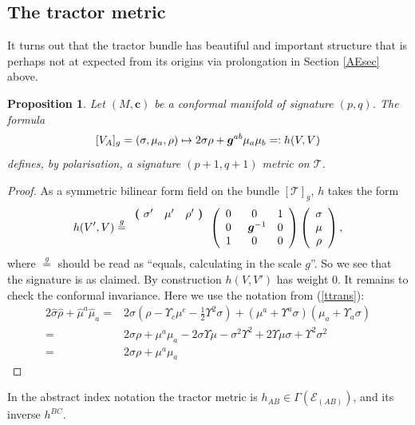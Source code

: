 \documentclass[a4paper,12pt]{amsart}
\def\Cal{\mathcal}
\newcommand{\cc}{\boldsymbol{c}}
\newcommand{\ce}{{\Cal E}}
\newcommand{\cT}{{\mathcal T}}
\def\bg{\mbox{\boldmath $g$}}
\newtheorem{proposition}[theorem]{Proposition}
\theoremstyle{remark}
\newcommand{\nn}[1]{(\ref{#1})}
\begin{document}
\subsection{The tractor metric}\label{msec}
It turns out that the tractor bundle has beautiful and important
structure that is perhaps not at expected from its origins via
prolongation in Section \ref{AEsec} above.
\begin{proposition} \label{metp} Let $(M,\cc)$ be a conformal manifold of signature $(p,q)$. The formula
\begin{equation}\nonumber 
[V_A]_g=(\sigma,\mu_a,\rho)\mapsto 2\sigma\rho+\bg^{ab}\mu_a\mu_b=:h(V,V)
\end{equation}
defines, by polarisation, a signature $(p+1,q+1)$ metric on $\mathcal{T}$.
\end{proposition}
\begin{proof}
As a symmetric bilinear form field on the bundle $[\cT]_g$, $h$ takes the form
\begin{equation}\label{mform}
h(V',V)\stackrel{g}{=}
\begin{array}{c c c} \boldsymbol{(}~\sigma' & \mu' & \rho'~\boldsymbol{)} \\ 
&&\\
&&
\end{array} 
\left(
\begin{array}{c c c}
0 & 0 & 1\\ 
0 & \phantom{1}\bg^{-1} & 0\\
1 & 0 & 0
\end{array}
\right)\left(
\begin{array}{c}
\sigma\\ 
 \mu \\
\rho
\end{array}
\right),
\end{equation}
where $\stackrel{g}{=}$ should be read as ``equals, calculating in the
scale $g$''. So we see that the signature is as claimed. By
construction $h(V,V')$ has weight 0.  It remains to check the
conformal invariance. Here we use the notation from \nn{ttrans}:
\begin{equation}\nonumber
\begin{split}
2\widehat{\sigma}\widehat{\rho}+\widehat{\mu}^a\widehat{\mu}_a=&
2\sigma(\rho-\Upsilon_c\mu^c-\frac{1}{2}\Upsilon^2\sigma)+
(\mu^a+\Upsilon^a\sigma)(\mu_a+\Upsilon_a\sigma)\\
=& 2\sigma\rho+\mu^a\mu_a-2\sigma\Upsilon\mu-\sigma^2\Upsilon^2+
2\Upsilon\mu\sigma+\Upsilon^2\sigma^2\\
=& 2\sigma\rho+\mu^a\mu_a
\end{split}
\end{equation}
\end{proof}
In the abstract index notation the tractor metric is  $h_{AB}\in \Gamma(\ce_{(AB)})$,
and its inverse $h^{BC}$. 
 
\end{document}
